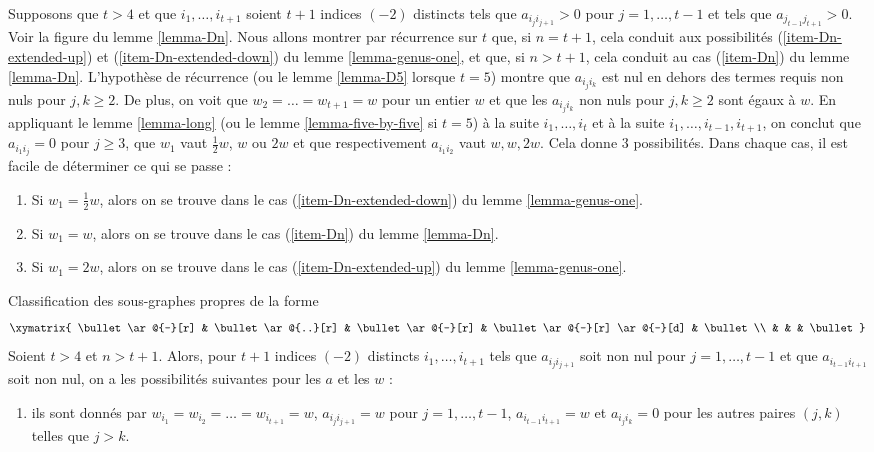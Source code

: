 \noindent
Supposons que $t > 4$ et que $i_1, \ldots, i_{t + 1}$ soient $t + 1$
indices $(-2)$ distincts tels que $a_{i_ji_{j + 1}} > 0$
pour $j = 1, \ldots, t - 1$ et tels que $a_{j_{t - 1}j_{t + 1}} > 0$.
Voir la figure du lemme \ref{lemma-Dn}. Nous allons montrer par récurrence sur $t$
que, si $n = t + 1$, cela conduit aux possibilités
(\ref{item-Dn-extended-up}) et (\ref{item-Dn-extended-down})
du lemme \ref{lemma-genus-one}, et que, si $n > t + 1$, cela conduit au
cas (\ref{item-Dn}) du lemme \ref{lemma-Dn}.
L'hypothèse de récurrence (ou le lemme \ref{lemma-D5} lorsque $t = 5$)
montre que $a_{i_ji_k}$ est nul en dehors des termes requis
non nuls pour $j, k \geq 2$.
De plus, on voit que $w_2 = \ldots = w_{t + 1} = w$ pour un entier
$w$ et que les $a_{i_ji_k}$ non nuls pour $j, k \geq 2$ sont
égaux à $w$. En appliquant le lemme \ref{lemma-long}
(ou le lemme \ref{lemma-five-by-five} si $t = 5$) à la suite
$i_1, \ldots, i_t$ et à la suite
$i_1, \ldots, i_{t - 1}, i_{t + 1}$, on conclut que
$a_{i_1 i_j} = 0$ pour $j \geq 3$, que
$w_1$ vaut $\frac{1}{2}w$, $w$ ou $2w$
et que respectivement $a_{i_1i_2}$ vaut $w, w, 2w$.
Cela donne $3$ possibilités. Dans chaque cas, il est facile de
déterminer ce qui se passe :
\begin{enumerate}
\item Si $w_1 = \frac{1}{2}w$, alors on se trouve dans le cas
(\ref{item-Dn-extended-down}) du lemme \ref{lemma-genus-one}.
\item Si $w_1 = w$, alors on se trouve dans le cas
(\ref{item-Dn}) du lemme \ref{lemma-Dn}.
\item Si $w_1 = 2w$, alors on se trouve dans le cas
(\ref{item-Dn-extended-up}) du lemme \ref{lemma-genus-one}.
\end{enumerate}

\begin{lemma}
\label{lemma-Dn}
Classification des sous-graphes propres de la forme
$$
\xymatrix{
\bullet \ar@{-}[r] & \bullet \ar@{..}[r] & \bullet \ar@{-}[r] &
\bullet \ar@{-}[r] \ar@{-}[d] & \bullet \\
& & & \bullet
}
$$
Soient $t > 4$ et $n > t + 1$. Alors, pour $t + 1$ indices
$(-2)$ distincts $i_1, \ldots, i_{t + 1}$ tels que $a_{i_ji_{j + 1}}$
soit non nul pour $j = 1, \ldots, t - 1$ et que $a_{i_{t - 1}i_{t + 1}}$
soit non nul, on a les possibilités suivantes pour les $a$ et les $w$ :
\begin{enumerate}
\item
\label{item-Dn}
ils sont donnés par $w_{i_1} = w_{i_2} = \ldots = w_{i_{t + 1}} = w$,
$a_{i_ji_{j + 1}} = w$ pour $j = 1, \ldots, t - 1$,
$a_{i_{t - 1}i_{t + 1}} = w$ et $a_{i_ji_k} = 0$ pour les autres
paires $(j, k)$ telles que $j > k$.
\end{enumerate}
\end{lemma}

